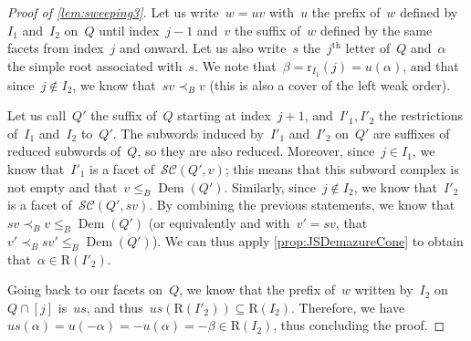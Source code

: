 \documentclass[reqno]{amsart}
\theoremstyle{definition}
\DeclareMathOperator{\DemazureProduct}{Dem} %
\newcommand{\subwordComplex}{\mathcal{SC}} %
\newcommand{\Roots}{\mathrm{R}} %
\newcommand{\rootFunction}[2]{\mathrm{r}_{#1}(#2)} %
\begin{document}
\begin{proof}[Proof of \cref{lem:sweeping3}]
Let us write~$w = uv$ with~$u$ the prefix of~$w$ defined by~$I_1$ and~$I_2$ on~$Q$ until index~$j-1$ and~$v$ the suffix of~$w$ defined by the same facets from index~$j$ and onward. Let us also write~$s$ the~$j^{\text{th}}$ letter of~$Q$ and~$\alpha$ the simple root associated with~$s$. We note that~$\beta = \rootFunction{I_1}{j} = u(\alpha)$, and that since~$j \notin I_2$, we know that~$sv \prec_B v$ (this is also a cover of the left weak order).

Let us call~$Q'$ the suffix of~$Q$ starting at index~$j+1$, and~$I'_1,I'_2$ the restrictions of~$I_1$ and~$I_2$ to~$Q'$. The subwords induced by~$I'_1$ and~$I'_2$ on~$Q'$ are suffixes of reduced subwords of~$Q$, so they are also reduced. Moreover, since~$j \in I_1$, we know that~$I'_1$ is a facet of~$\subwordComplex(Q',v)$; this means that this subword complex is not empty and that~$v \leqslant_B \DemazureProduct(Q')$. Similarly, since~$j \notin I_2$, we know that~$I'_2$ is a facet of~$\subwordComplex(Q',sv)$. By combining the previous statements, we know that~$sv \prec_B v \leqslant_B \DemazureProduct(Q')$ (or equivalently and with~$v' = sv$, that~$v' \prec_B sv' \leqslant_B \DemazureProduct(Q')$). We can thus apply \cref{prop:JSDemazureCone} to obtain that~$\alpha \in \Roots(I'_2)$.

Going back to our facets on~$Q$, we know that the prefix of~$w$ written by~$I_2$ on~$Q \cap [j]$ is~$us$, and thus~$us(\Roots(I'_2)) \subseteq \Roots(I_2)$. Therefore, we have~$us(\alpha) = u(-\alpha) = -u(\alpha) = -\beta \in \Roots(I_2)$, thus concluding the proof.
\end{proof}
\end{document}
